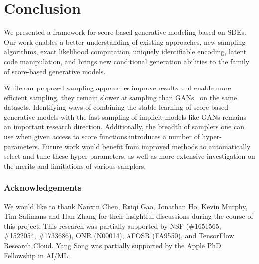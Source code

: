 \section{Conclusion}
We presented a framework for score-based generative modeling based on SDEs. Our work enables a better understanding of existing approaches,  new sampling algorithms, exact likelihood computation, uniquely identifiable encoding, latent code manipulation, and brings new conditional generation abilities to the family of score-based generative models.

While our proposed sampling approaches improve results and enable more efficient sampling, they remain slower at sampling than GANs~\citep{goodfellow2014generative} on the same datasets. Identifying ways of combining the stable learning of score-based generative models with the fast sampling of implicit models like GANs remains an important research direction. Additionally, the breadth of samplers one can use when given access to score functions introduces a number of hyper-parameters. Future work would benefit from improved methods to automatically select and tune these hyper-parameters, as well as more extensive investigation on the merits and limitations of various samplers.

\subsubsection*{Acknowledgements}
We would like to thank Nanxin Chen, Ruiqi Gao, Jonathan Ho, Kevin Murphy, Tim Salimans and Han Zhang for their insightful discussions during the course of this project. This research was partially supported by NSF (\#1651565, \#1522054, \#1733686),
ONR (N00014), AFOSR (FA9550), and TensorFlow Research Cloud. Yang Song was partially supported by the Apple PhD Fellowship in AI/ML.